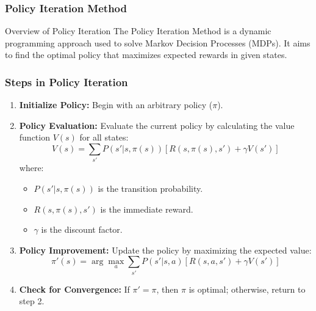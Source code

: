 \documentclass[aspectratio=169]{beamer}
\begin{document}
\begin{frame}[fragile]
    \frametitle{Policy Iteration Method}
    \begin{block}{Overview of Policy Iteration}
        The Policy Iteration Method is a dynamic programming approach used to solve Markov Decision Processes (MDPs). It aims to find the optimal policy that maximizes expected rewards in given states.
    \end{block}
\end{frame}

\begin{frame}[fragile]
    \frametitle{Steps in Policy Iteration}
    \begin{enumerate}
        \item \textbf{Initialize Policy:} Begin with an arbitrary policy ($\pi$).
        
        \item \textbf{Policy Evaluation:}
        Evaluate the current policy by calculating the value function $V(s)$ for all states:
        \begin{equation}
            V(s) = \sum_{s'} P(s'|s, \pi(s)) \left[ R(s, \pi(s), s') + \gamma V(s') \right]
        \end{equation}
        where:
        \begin{itemize}
            \item $P(s'|s, \pi(s))$ is the transition probability.
            \item $R(s, \pi(s), s')$ is the immediate reward.
            \item $\gamma$ is the discount factor.
        \end{itemize}
        
        \item \textbf{Policy Improvement:} Update the policy by maximizing the expected value:
        \begin{equation}
            \pi'(s) = \arg\max_{a} \sum_{s'} P(s'|s, a) \left[ R(s, a, s') + \gamma V(s') \right]
        \end{equation}

        \item \textbf{Check for Convergence:} If $\pi' = \pi$, then $\pi$ is optimal; otherwise, return to step 2.
    \end{enumerate}
\end{frame}
\end{document}
